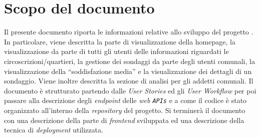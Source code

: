 \chapter*{Scopo del documento}
\thispagestyle{eccScopo}

Il presente documento riporta le informazioni relative allo sviluppo del progetto \ProjectTitle. In particolare, viene descritta la parte di visualizzazione della homepage, la visualizzazione da parte di tutti gli utenti delle informazioni riguardati le circoscrizioni/quartieri, la gestione dei sondaggi da parte degli utenti comunali, la visualizzazione della ``soddisfazione media'' e la visualizzazione dei dettagli di un sondaggio. Viene inoltre descritta la sezione di analisi per gli addetti comunali.\newline
Il documento è strutturato partendo dalle \textit{User Stories} ed gli \textit{User Workflow} per poi passare alla descrizione degli \textit{endpoint} delle \textit{web \texttt{APIs}} e a come il codice è stato organizzato all'interno della \textit{repository} del progetto. Si terminerà il documento con una descrizione della parte di \textit{frontend} sviluppata ed una descrizione della tecnica di \textit{deployment} utilizzata.